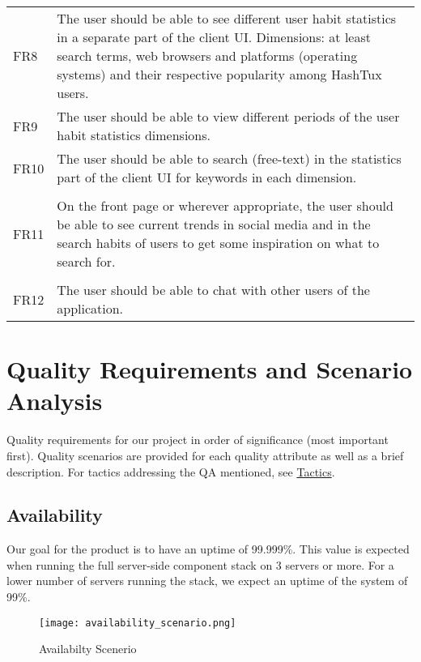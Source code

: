 \newpage

{\tabulinesep=1.4mm
\begin{tabu}{|l|l|}
\hline
{}
 \\
\hline
\taburowcolors {}
FR8 & \parbox[t]{105mm}{The user should be able to see different user habit
   statistics in a separate part of the client UI. Dimensions: at least search
   terms, web browsers and platforms (operating systems) and their respective
   popularity among HashTux users.} \\
\hline
FR9 & \parbox[t]{105mm}{The user should be able to view different periods of the
   user habit statistics dimensions.} \\
\hline
FR10 & \parbox[t]{105mm}{The user should be able to search (free-text) in the
   statistics part of the client UI for keywords in each dimension.} \\
\hline
{}
  \\
\hline
\taburowcolors{}
FR11 & \parbox[t]{105mm}{On the front page or wherever appropriate, the user
   should be able to see current trends in social media and in the search habits
   of users to get some inspiration on what to search for.} \\
\hline
{}
   \\
\hline
\taburowcolors{}
FR12 & \parbox[t]{105mm}{The user should be able to chat with other users of the
   application.} \\
\hline
\end{tabu}}

\section{Quality Requirements and Scenario Analysis}
Quality requirements for our project in order of significance (most important
first). Quality scenarios are provided for each quality attribute as well as a
brief description. For tactics addressing the QA mentioned, see
\hyperlink{tactics}{Tactics}.

\subsection{Availability}
Our goal for the product is to have an uptime of 99.999\%. This value is
expected when running the full server-side component stack on 3 servers or more.
For a lower number of servers running the stack, we expect an uptime of the
system of 99\%.
\begin{figure}[ht]
  \centering
  \texttt{[image: availability\_scenario.png]}
  \caption{Availabilty Scenerio}
\end{figure}

